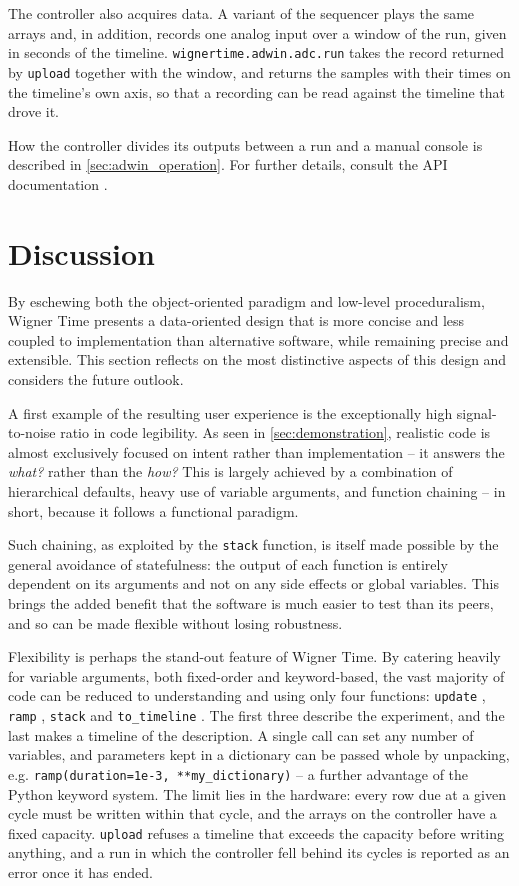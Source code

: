 \documentclass{SciPost}
\newcommand{\python}[1]{%
  \texttt{#1}%
}
\begin{document}
The controller also acquires data. A variant of the sequencer plays the same arrays and, in addition, records one analog input over a window of the run, given in seconds of the timeline. \python{wignertime.adwin.adc.run} takes the record returned by \python{upload} together with the window, and returns the samples with their times on the timeline’s own axis, so that a recording can be read against the timeline that drove it.

\medskip
How the controller divides its outputs between a run and a manual console is described in \cref{sec:adwin_operation}. For further details, consult the API documentation \cite{wignertime_docs}.
 
 
\section{Discussion}
\label{sec:discussion}
By eschewing both the object-oriented paradigm and low-level proceduralism, Wigner Time presents a data-oriented design that is more concise and less coupled to implementation than alternative software, while remaining precise and extensible. This section reflects on the most distinctive aspects of this design and considers the future outlook.
 
A first example of the resulting user experience is the exceptionally high signal-to-noise ratio in code legibility. As seen in \cref{sec:demonstration}, realistic code is almost exclusively focused on intent rather than implementation – it answers the \emph{what?} rather than the \emph{how?} This is largely achieved by a combination of hierarchical defaults, heavy use of variable arguments, and function chaining – in short, because it follows a functional paradigm.
 
Such chaining, as exploited by the \python{stack} function, is itself made possible by the general avoidance of statefulness: the output of each function is entirely dependent on its arguments and not on any side effects or global variables. This brings the added benefit that the software is much easier to test than its peers, and so can be made flexible without losing robustness.
 
Flexibility is perhaps the stand-out feature of Wigner Time. By catering heavily for variable arguments, both fixed-order and keyword-based, the vast majority of code can be reduced to understanding and using only four functions: \python{update}, \python{ramp}, \python{stack} and \python{to_timeline}. The first three describe the experiment, and the last makes a timeline of the description. A single call can set any number of variables, and parameters kept in a dictionary can be passed whole by unpacking, e.g. \python{ramp(duration=1e-3, **my_dictionary)} – a further advantage of the Python keyword system. The limit lies in the hardware: every row due at a given cycle must be written within that cycle, and the arrays on the controller have a fixed capacity. \python{upload} refuses a timeline that exceeds the capacity before writing anything, and a run in which the controller fell behind its cycles is reported as an error once it has ended.
 
\end{document}
